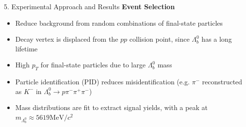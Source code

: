 \documentclass[xcolor=dvipsnames]{beamer}
\def\Ld{\Lambda}
\begin{document}
\begin{frame}{5. Experimental Approach and Results}
\textbf{Event Selection}\\
\begin{itemize}
    \item Reduce background from random combinations of final-state particles
    \item Decay vertex is displaced from the $pp$ collision point, since $\Ld_{b}^{0}$ has a long lifetime
    \item High $p_{T}$ for final-state particles due to large $\Ld_{b}^{0}$ mass
    \item Particle identification (PID) reduces misidentification (e.g. $\pi^{-}$ reconstructed as $K^{-}$ in $\Ld_{b}^{0}\to p\pi^{-}\pi^{+}\pi^{-}$)
    \item Mass distributions are fit to extract signal yields, with a peak at $m_{\Ld_{b}^{0}}\approx 5619\mathrm{MeV}/c^{2}$
\end{itemize}
\end{frame}
\end{document}
